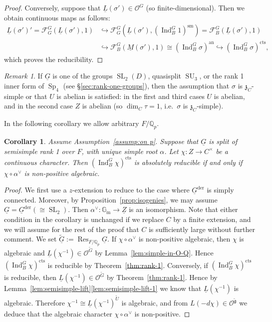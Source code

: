 \documentclass[a4paper]{amsart}
\numberwithin{equation}{section}
\newtheorem{cor}[thm]{Corollary}
\theoremstyle{remark}
\newtheorem{remark}[thm]{Remark}
\theoremstyle{definition}
\DeclareMathOperator{\Ind}{Ind}
\DeclareMathOperator{\Res}{Res}
\newcommand{\Q}{\mathbb{Q}}
\DeclareMathOperator{\SL}{SL}
\DeclareMathOperator{\SU}{SU}
\DeclareMathOperator{\Sp}{Sp}
\newcommand{\sm}{\mathrm{sm}}
\newcommand{\alggrp}[1]{\underline{#1}}
\newcommand{\an}{\mathrm{an}}
\newcommand{\der}{\mathrm{der}}
\newcommand{\cts}{\mathrm{cts}}
\newcommand{\into}{\hookrightarrow}
\newcommand{\wt}[1]{\widetilde{#1}}
\begin{document}
\begin{proof}
  Conversely, suppose that $\underline L(\sigma') \in \mathcal O^G$ (so finite-dimensional).
  Then we obtain continuous maps as follows:
  \begin{align*}
    \underline L(\sigma')' = \mathcal F_G^G(\underline L(\sigma'),1) &\into \mathcal F_G^G(\underline L(\sigma'),(\Ind_B^G 1)^\sm) = \mathcal F_B^G(\underline L(\sigma'),1)\\
    & \into \mathcal F_B^G(\underline M(\sigma'),1) \cong (\Ind_{B}^{G}\sigma)^{\an} \into (\Ind_{B}^{G}\sigma)^{\cts},
  \end{align*}
  which proves the reducibility.
\end{proof}

\begin{remark}
  If $\alggrp G$ is one of the groups $\SL_2(D)$, quasisplit $\SU_3$, or the rank 1 inner form of $\Sp_4$ (see \S\ref{sec:rank-one-groups}), then the assumption that $\sigma$ is $\mathfrak z_C$-simple or that $U$ is abelian is satisfied: in the first and third cases $U$ is abelian, and in the second case $Z$ is abelian (so $\dim_C \tau = 1$, i.e.\ $\sigma$ is $\mathfrak z_C$-simple).
\end{remark}

In the following corollary we allow arbitrary $F/\Q_p$.

\begin{cor}\label{cor:rank-1-split}
  Assume Assumption~\ref{assump:on p}.
  Suppose that $\alggrp G$ is split of semisimple rank 1 over $F$, with unique simple root $\alpha$.
  Let $\chi\colon Z \to C^{\times}$ be a continuous character.
  Then $(\Ind_{B}^{G}\chi)^{\cts}$ is absolutely reducible if and only if $\chi \circ \alpha^\vee$ is non-positive algebraic.
\end{cor}

\begin{proof}
  We first use a $z$-extension to reduce to the case where $\alggrp G^\der$ is simply connected.
  Moreover, by Proposition~\ref{prop:isogenies}, we may assume $\alggrp{G} = \alggrp{G}^{\der} (\cong \SL_2)$.
  Then $\alpha^{\vee} \colon \mathbb{G}_{\mathrm{m}}\to \alggrp Z$ is an isomorphism.
  Note that either condition in the corollary is unchanged if we replace $C$ by a finite extension, and we will assume for the rest of the proof that $C$ is sufficiently large without further comment.
  We set $\widetilde{\alggrp{G}} := \Res_{F/\Q_{p}}\alggrp{G}$.
  If $\chi\circ\alpha^{\vee}$ is non-positive algebraic, then $\chi$ is algebraic and $\underline{L}(\chi^{-1})\in \mathcal{O}^{\widetilde{G}}$ by Lemma~\ref{lem:simple-in-O-Q}.
  Hence $(\Ind_{B}^{G}\chi)^{\cts}$ is reducible by Theorem~\ref{thm:rank-1}.
  Conversely, if $(\Ind_{B}^{G}\chi)^{\cts}$ is reducible, then $\underline{L}(\chi^{-1})\in \mathcal{O}^{\widetilde{G}}$ by Theorem~\ref{thm:rank-1}.
  Hence by Lemma~\ref{lem:semisimple-lift}\ref{lem:semisimple-lift-1} we know that $\underline{L}(\chi^{-1})$ is algebraic.
  Therefore $\chi^{-1} \cong \underline{L}(\chi^{-1})^{\wt U}$ is algebraic, and from $L(-d\chi)\in \mathcal{O}^{\widetilde{\mathfrak g}}$ we deduce that the algebraic character $\chi\circ\alpha^{\vee}$ is non-positive.
\end{proof}
\end{document}
